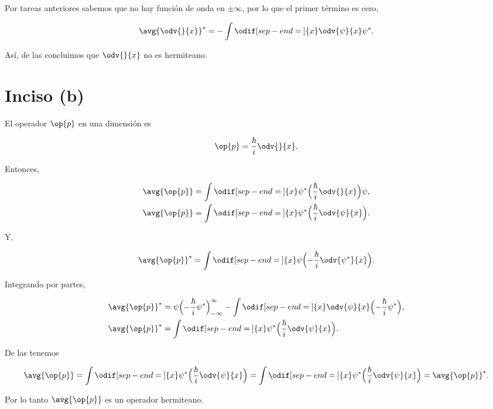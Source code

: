 \documentclass[../main.tex]{subfiles}
\begin{document}
\begin{problema}[10]
	Por tareas anteriores sabemos que no hay función de onda en \(\pm \infty\), por lo
	que el primer término es cero,

	\begin{equation*}
		\avg{\odv{}{x}}^{*} = - \int \odif[sep-end=\medspace]{x} \odv{\psi}{x} \psi^{*}.
		\label{eq:avg-psi-star}
	\end{equation*}

	Así, de las  concluimos que
	\(\odv{}{x}\) no es hermiteano.

	\section{Inciso (b)}

	El operador \(\op{p}\) en una dimensión es

	\begin{equation*}
		\op{p} = \dfrac{\hbar}{i}\odv{}{x}.
	\end{equation*}

	Entonces,

	\begin{align}
		\avg{\op{p}} & = \int \odif[sep-end=\medspace]{x} \psi^{*}\Bigl(\dfrac{\hbar}{i}\odv{}{x}\Bigr)\psi,\nonumber        \\
		\avg{\op{p}} & = \int \odif[sep-end=\medspace]{x} \psi^{*}\Bigl(\dfrac{\hbar}{i}\odv{\psi}{x}\Bigr).\label{eq:avg-p}
	\end{align}

	Y,

	\begin{equation*}
		\avg{\op{p}}^{*} = \int \odif[sep-end=\medspace]{x} \psi \Bigl(-\dfrac{\hbar}{i}\odv{\psi^{*}}{x}\Bigr).
	\end{equation*}

	Integrando por partes,

	\begin{align}
		\avg{\op{p}}^{*} & = \psi \Bigl(-\dfrac{\hbar}{i}\psi^{*}\Bigr)_{-\infty}^{\infty} - \int \odif[sep-end=\medspace]{x} \odv{\psi}{x}\Bigl(-\dfrac{\hbar}{i}\psi^{*}\Bigr),\nonumber \\
		\avg{\op{p}}^{*} & = \int \odif[sep-end=\medspace]{x} \psi^{*}\Bigl(\dfrac{\hbar}{i}\odv{\psi}{x}\Bigr). \label{eq:avg-p-star}
	\end{align}

	De las  tenemos

	\begin{equation*}
		\avg{\op{p}} = \int \odif[sep-end=\medspace]{x} \psi^{*}\Bigl(\dfrac{\hbar}{i}\odv{\psi}{x}\Bigr) = \int \odif[sep-end=\medspace]{x} \psi^{*}\Bigl(\dfrac{\hbar}{i}\odv{\psi}{x}\Bigr) = \avg{\op{p}}^{*}.
	\end{equation*}

	Por lo tanto \(\avg{\op{p}}\) es un operador hermiteano.

\end{problema}
\end{document}

